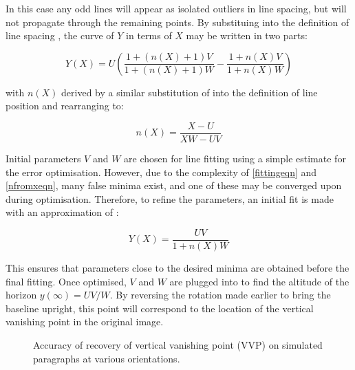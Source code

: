 {{In this case any odd lines will appear as isolated outliers in line spacing, but will not propagate through the remaining points.
By substituing  into the definition of line spacing , the curve of $Y$ in terms of $X$ may be written in two parts:
}

\begin{equation}
Y(X) = U ( \frac{1+(n(X)+1)V}{1+(n(X)+1)W} - \frac{1+n(X)V}{1+n(X)W} )
\label{fittingeqn}
\end{equation}

{\parindent 0mm
with $n(X)$ derived by a similar substitution of  into the definition of line position  and rearranging to:
}

\begin{equation}
n(X) = \frac{X-U}{XW-UV}
\label{nfromxeqn}
\end{equation}

Initial parameters $V$ and $W$ are chosen for line fitting using a simple estimate for the error optimisation.
However, due to the complexity of \ref{fittingeqn} and \ref{nfromxeqn}, many false minima exist, and one of these may be converged upon during optimisation.
Therefore, to refine the parameters, an initial fit is made with an approximation of :

\begin{equation}
Y(X) = \frac{ UV }{ 1+n(X)W }
\end{equation}

This ensures that parameters close to the desired minima are obtained before the final fitting.  Once optimised, $V$ and $W$ are plugged into  to find the altitude of the horizon $y(\infty) = UV/W$.
By reversing the rotation made earlier to bring the baseline upright, this point will correspond to the location of the vertical vanishing point in the original image.

\begin{figure}[t]
\begin{centering}
	\hspace{2mm}
\caption{Accuracy of recovery of vertical vanishing point (VVP) on simulated paragraphs at various orientations.}
\label{vvpaccuracy}
\end{centering}
\end{figure}

}
